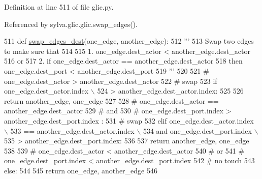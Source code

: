 Definition at line 511 of file glic.\+py.



Referenced by sylva.\+glic.\+glic.\+swap\+\_\+edges().


\begin{DoxyCode}
511   \textcolor{keyword}{def }\hyperlink{namespacesylva_1_1glic_1_1glic_a478b14bc177ffdfb87bc422a3e2fa0f1}{swap\_edges\_dest}(one\_edge, another\_edge):
512     \textcolor{stringliteral}{'''}
513 \textcolor{stringliteral}{      Swap two edges to make sure that}
514 \textcolor{stringliteral}{}
515 \textcolor{stringliteral}{      1. one\_edge.dest\_actor < another\_edge.dest\_actor}
516 \textcolor{stringliteral}{      or}
517 \textcolor{stringliteral}{      2. if one\_edge.dest\_actor == another\_edge.dest\_actor}
518 \textcolor{stringliteral}{         then one\_edge.dest\_port < another\_edge.dest\_port}
519 \textcolor{stringliteral}{    '''}
520 
521     \textcolor{comment}{# one\_edge.dest\_actor > another\_edge.dest\_actor}
522     \textcolor{comment}{# swap}
523     \textcolor{keywordflow}{if} one\_edge.dest\_actor.index \(\backslash\)
524             > another\_edge.dest\_actor.index:
525 
526       \textcolor{keywordflow}{return} another\_edge, one\_edge
527 
528     \textcolor{comment}{# one\_edge.dest\_actor == another\_edge.dest\_actor}
529     \textcolor{comment}{# and}
530     \textcolor{comment}{# one\_edge.dest\_port.index > another\_edge.dest\_port.index :}
531     \textcolor{comment}{# swap}
532     \textcolor{keywordflow}{elif} one\_edge.dest\_actor.index \(\backslash\)
533         == another\_edge.dest\_actor.index \(\backslash\)
534         \textcolor{keywordflow}{and} one\_edge.dest\_port.index \(\backslash\)
535             > another\_edge.dest\_port.index:
536 
537       \textcolor{keywordflow}{return} another\_edge, one\_edge
538 
539     \textcolor{comment}{# one\_edge.dest\_actor < another\_edge.dest\_actor}
540     \textcolor{comment}{# or}
541     \textcolor{comment}{# one\_edge.dest\_port.index < another\_edge.dest\_port.index}
542     \textcolor{comment}{# no touch}
543     \textcolor{keywordflow}{else}:
544 
545       \textcolor{keywordflow}{return} one\_edge, another\_edge
546 
\end{DoxyCode}
\mbox{\label{namespacesylva_1_1glic_1_1glic_a6e0ff8a8e5ef9956ef0b31be0fb0bf0e}} 
